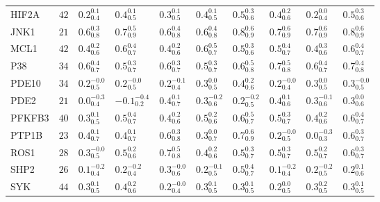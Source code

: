 \begin{tabular}{llllllllll}
HIF2A       &   $42$ &   $0.2^{0.1}_{0.4}$ &    $0.4^{0.1}_{0.5}$ &    $0.3^{0.1}_{0.5}$ &   $0.4^{0.1}_{0.5}$ &   $0.5^{0.3}_{0.6}$ &   $0.4^{0.2}_{0.6}$ &     $0.2^{0.0}_{0.4}$ &   $0.5^{0.3}_{0.6}$ \\
JNK1        &   $21$ &   $0.6^{0.3}_{0.8}$ &    $0.7^{0.5}_{0.9}$ &    $0.6^{0.4}_{0.8}$ &   $0.6^{0.4}_{0.8}$ &   $0.8^{0.6}_{0.9}$ &   $0.7^{0.6}_{0.9}$ &     $0.7^{0.6}_{0.9}$ &   $0.8^{0.6}_{0.9}$ \\
MCL1        &   $42$ &   $0.4^{0.2}_{0.6}$ &    $0.6^{0.4}_{0.7}$ &    $0.4^{0.2}_{0.6}$ &   $0.6^{0.5}_{0.7}$ &   $0.5^{0.3}_{0.6}$ &   $0.5^{0.4}_{0.7}$ &     $0.4^{0.3}_{0.6}$ &   $0.6^{0.4}_{0.7}$ \\
P38         &   $34$ &   $0.6^{0.4}_{0.7}$ &    $0.5^{0.3}_{0.7}$ &    $0.6^{0.3}_{0.7}$ &   $0.5^{0.3}_{0.7}$ &   $0.6^{0.5}_{0.8}$ &   $0.7^{0.5}_{0.8}$ &     $0.6^{0.4}_{0.7}$ &   $0.7^{0.4}_{0.8}$ \\
PDE10       &   $34$ &  $0.2^{-0.0}_{0.5}$ &   $0.2^{-0.0}_{0.5}$ &   $0.2^{-0.1}_{0.4}$ &   $0.3^{0.0}_{0.5}$ &   $0.4^{0.2}_{0.6}$ &  $0.2^{-0.0}_{0.4}$ &     $0.3^{0.0}_{0.5}$ &  $0.3^{-0.0}_{0.5}$ \\
PDE2        &   $21$ &  $0.0^{-0.3}_{0.4}$ &  $-0.1^{-0.4}_{0.2}$ &    $0.4^{0.1}_{0.7}$ &  $0.3^{-0.2}_{0.6}$ &  $0.2^{-0.2}_{0.5}$ &   $0.4^{0.1}_{0.6}$ &    $0.3^{-0.1}_{0.6}$ &   $0.3^{0.0}_{0.6}$ \\
PFKFB3      &   $40$ &   $0.3^{0.1}_{0.5}$ &    $0.5^{0.4}_{0.7}$ &    $0.4^{0.2}_{0.6}$ &   $0.5^{0.2}_{0.6}$ &   $0.6^{0.5}_{0.7}$ &   $0.5^{0.3}_{0.7}$ &     $0.4^{0.2}_{0.6}$ &   $0.6^{0.4}_{0.7}$ \\
PTP1B       &   $23$ &   $0.4^{0.1}_{0.7}$ &    $0.4^{0.1}_{0.7}$ &    $0.6^{0.3}_{0.8}$ &   $0.3^{0.0}_{0.7}$ &   $0.7^{0.6}_{0.9}$ &  $0.2^{-0.0}_{0.5}$ &    $0.0^{-0.3}_{0.3}$ &   $0.6^{0.3}_{0.7}$ \\
ROS1        &   $28$ &  $0.3^{-0.0}_{0.5}$ &    $0.5^{0.2}_{0.6}$ &    $0.7^{0.5}_{0.8}$ &   $0.4^{0.2}_{0.6}$ &   $0.5^{0.3}_{0.7}$ &   $0.5^{0.3}_{0.7}$ &     $0.5^{0.2}_{0.7}$ &   $0.6^{0.3}_{0.7}$ \\
SHP2        &   $26$ &  $0.1^{-0.2}_{0.4}$ &   $0.2^{-0.2}_{0.4}$ &   $0.3^{-0.0}_{0.6}$ &  $0.2^{-0.1}_{0.5}$ &   $0.5^{0.4}_{0.7}$ &  $0.1^{-0.2}_{0.4}$ &    $0.2^{-0.2}_{0.5}$ &   $0.2^{0.1}_{0.6}$ \\
SYK         &   $44$ &   $0.3^{0.1}_{0.5}$ &    $0.4^{0.2}_{0.6}$ &   $0.2^{-0.0}_{0.4}$ &   $0.3^{0.1}_{0.5}$ &   $0.3^{0.1}_{0.5}$ &   $0.2^{0.0}_{0.5}$ &     $0.3^{0.2}_{0.5}$ &   $0.3^{0.1}_{0.5}$ \\

\end{tabular}
